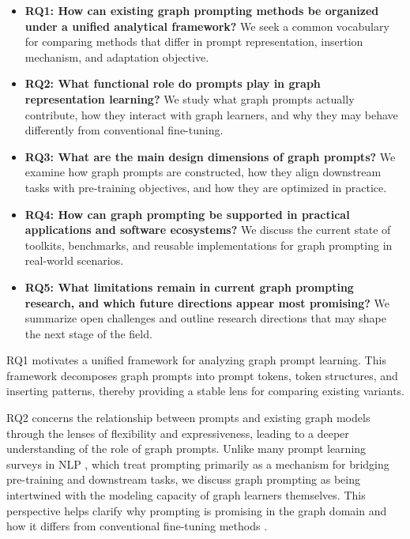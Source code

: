 \begin{itemize}
    \item \textbf{RQ1: How can existing graph prompting methods be organized under a unified analytical framework?} We seek a common vocabulary for comparing methods that differ in prompt representation, insertion mechanism, and adaptation objective.
   \item  \textbf{RQ2: What functional role do prompts play in graph representation learning?} We study what graph prompts actually contribute, how they interact with graph learners, and why they may behave differently from conventional fine-tuning.


   \item  \textbf{RQ3: What are the main design dimensions of graph prompts?} We examine how graph prompts are constructed, how they align downstream tasks with pre-training objectives, and how they are optimized in practice.





   \item  \textbf{RQ4: How can graph prompting be supported in practical applications and software ecosystems?} We discuss the current state of toolkits, benchmarks, and reusable implementations for graph prompting in real-world scenarios.


   \item  \textbf{RQ5: What limitations remain in current graph prompting research, and which future directions appear most promising?} We summarize open challenges and outline research directions that may shape the next stage of the field.


\end{itemize}




RQ1 motivates a unified framework for analyzing graph prompt learning. This framework decomposes graph prompts into prompt tokens, token structures, and inserting patterns, thereby providing a stable lens for comparing existing variants.


RQ2 concerns the relationship between prompts and existing graph models through the lenses of flexibility and expressiveness, leading to a deeper understanding of the role of graph prompts. Unlike many prompt learning surveys in NLP \cite{liu2023pretrain}, which treat prompting primarily as a mechanism for bridging pre-training and downstream tasks, we discuss graph prompting as being intertwined with the modeling capacity of graph learners themselves. This perspective helps clarify why prompting is promising in the graph domain and how it differs from conventional fine-tuning methods \cite{hu2020strategies}.


